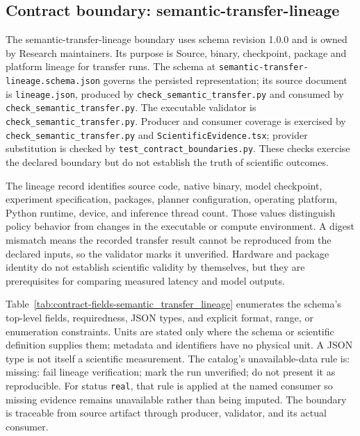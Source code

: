 \subsection{Contract boundary: semantic-transfer-lineage}\label{sec:contract-semantic_transfer_lineage}
The semantic-transfer-lineage boundary uses schema revision 1.0.0 and is owned by Research maintainers. Its purpose is Source, binary, checkpoint, package and platform lineage for transfer runs. The schema at \texttt{semantic-transfer-lineage.schema.json} governs the persisted representation; its source document is \texttt{lineage.json}, produced by \texttt{check\_\allowbreak{}semantic\_\allowbreak{}transfer.py} and consumed by \texttt{check\_\allowbreak{}semantic\_\allowbreak{}transfer.py}. The executable validator is \texttt{check\_\allowbreak{}semantic\_\allowbreak{}transfer.py}. Producer and consumer coverage is exercised by \texttt{check\_\allowbreak{}semantic\_\allowbreak{}transfer.py} and \texttt{Scientific\allowbreak{}Evidence.tsx}; provider substitution is checked by \texttt{test\_\allowbreak{}contract\_\allowbreak{}boundaries.py}. These checks exercise the declared boundary but do not establish the truth of scientific outcomes.

The lineage record identifies source code, native binary, model checkpoint, experiment specification, packages, planner configuration, operating platform, Python runtime, device, and inference thread count. Those values distinguish policy behavior from changes in the executable or compute environment. A digest mismatch means the recorded transfer result cannot be reproduced from the declared inputs, so the validator marks it unverified. Hardware and package identity do not establish scientific validity by themselves, but they are prerequisites for comparing measured latency and model outputs.

Table~\ref{tab:contract-fields-semantic_transfer_lineage} enumerates the schema's top-level fields, requiredness, JSON types, and explicit format, range, or enumeration constraints. Units are stated only where the schema or scientific definition supplies them; metadata and identifiers have no physical unit. A JSON type is not itself a scientific measurement. The catalog's unavailable-data rule is: missing: fail lineage verification; mark the run unverified; do not present it as reproducible. For status \texttt{real}, that rule is applied at the named consumer so missing evidence remains unavailable rather than being imputed. The boundary is traceable from source artifact through producer, validator, and its actual consumer.

